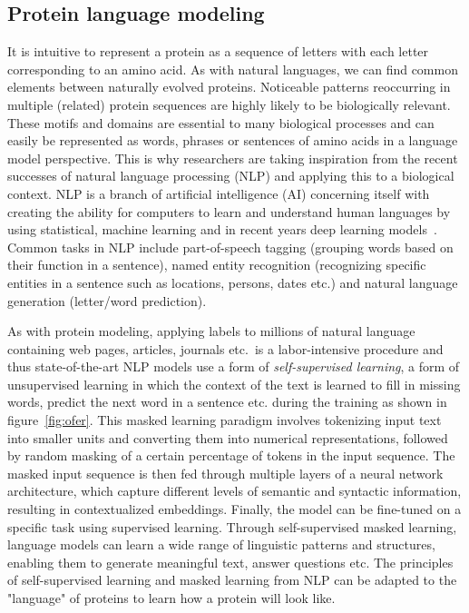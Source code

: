 \subsection{Protein language modeling}\label{ssec:nlp}
It is intuitive to represent a protein as a sequence of letters with each letter corresponding to an amino acid. As with natural languages, we can find common elements between naturally evolved proteins. Noticeable patterns reoccurring in multiple (related) protein sequences are highly likely to be biologically relevant. These motifs and domains are essential to many biological processes and can easily be represented as words, phrases or sentences of amino acids in a language model perspective. This is why researchers are taking inspiration from the recent successes of natural language processing (NLP) and applying this to a biological context. NLP is a branch of artificial intelligence (AI) concerning itself with creating the ability for computers to learn and understand human languages by using statistical, machine learning and in recent years deep learning models~\cite{Ofer}. Common tasks in NLP include part-of-speech tagging (grouping words based on their function in a sentence), named entity recognition (recognizing specific entities in a sentence such as locations, persons, dates etc.) and natural language generation (letter/word prediction).

As with protein modeling, applying labels to millions of natural language containing web pages, articles, journals etc.\ is a labor-intensive procedure and thus state-of-the-art NLP models use a form of \textit{self-supervised learning}, a form of unsupervised learning in which the context of the text is learned to fill in missing words, predict the next word in a sentence etc. during the training as shown in figure~\ref{fig:ofer}. This masked learning paradigm involves tokenizing input text into smaller units and converting them into numerical representations, followed by random masking of a certain percentage of tokens in the input sequence. The masked input sequence is then fed through multiple layers of a neural network architecture, which capture different levels of semantic and syntactic information, resulting in contextualized embeddings. Finally, the model can be fine-tuned on a specific task using supervised learning. Through self-supervised masked learning, language models can learn a wide range of linguistic patterns and structures, enabling them to generate meaningful text, answer questions etc. The principles of self-supervised learning and masked learning from NLP can be adapted to the "language" of proteins to learn how a protein will look like.

